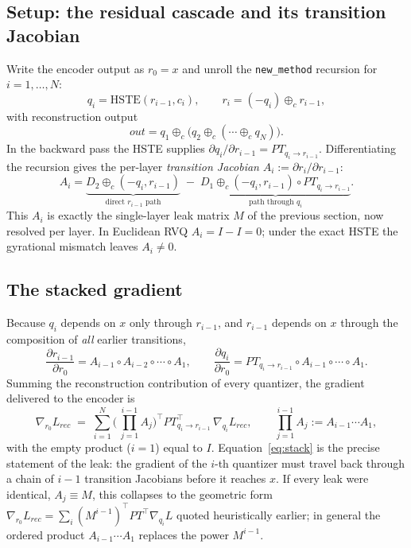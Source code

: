 \documentclass{article}
\begin{document}
\subsection*{Setup: the residual cascade and its transition Jacobian}
Write the encoder output as $r_0 = x$ and unroll the \texttt{new\_method} recursion for $i = 1,\dots,N$:
\begin{equation}
    q_i = \mathrm{HSTE}(r_{i-1}, c_i), \qquad r_i = (-q_i)\oplus_c r_{i-1},
\end{equation}
with reconstruction output
\begin{equation}
    out = q_1 \oplus_c \big(q_2 \oplus_c (\cdots \oplus_c q_N)\big).
\end{equation}
In the backward pass the HSTE supplies $\partial q_i/\partial r_{i-1} = PT_{q_i\to r_{i-1}}$. Differentiating the recursion gives the per-layer \emph{transition Jacobian} $A_i := \partial r_i/\partial r_{i-1}$:
\begin{equation}
    A_i = \underbrace{D_2 \oplus_c(-q_i, r_{i-1})}_{\text{direct } r_{i-1}\text{ path}} \;-\; \underbrace{D_1 \oplus_c(-q_i, r_{i-1}) \circ PT_{q_i\to r_{i-1}}}_{\text{path through } q_i}.
\end{equation}
This $A_i$ is exactly the single-layer leak matrix $M$ of the previous section, now resolved per layer. In Euclidean RVQ $A_i = I - I = 0$; under the exact HSTE the gyrational mismatch leaves $A_i \neq 0$.

\subsection*{The stacked gradient}
Because $q_i$ depends on $x$ only through $r_{i-1}$, and $r_{i-1}$ depends on $x$ through the composition of \emph{all} earlier transitions,
\begin{equation}
    \frac{\partial r_{i-1}}{\partial r_0} = A_{i-1} \circ A_{i-2} \circ \cdots \circ A_1,
    \qquad
    \frac{\partial q_i}{\partial r_0} = PT_{q_i\to r_{i-1}} \circ A_{i-1} \circ \cdots \circ A_1 .
\end{equation}
Summing the reconstruction contribution of every quantizer, the gradient delivered to the encoder is
\begin{equation}\label{eq:stack}
    \nabla_{r_0} L_{rec} \;=\; \sum_{i=1}^{N} \Big(\, \textstyle\prod_{j=1}^{i-1} A_j \Big)^{\!\top} PT_{q_i\to r_{i-1}}^{\top}\, \nabla_{q_i} L_{rec},
    \qquad \textstyle\prod_{j=1}^{i-1} A_j := A_{i-1} \cdots A_1 ,
\end{equation}
with the empty product ($i=1$) equal to $I$. Equation~\eqref{eq:stack} is the precise statement of the leak: the gradient of the $i$-th quantizer must travel back through a chain of $i-1$ transition Jacobians before it reaches $x$. If every leak were identical, $A_j \equiv M$, this collapses to the geometric form $\nabla_{r_0} L_{rec} = \sum_i (M^{i-1})^{\top} PT^{\top} \nabla_{q_i} L$ quoted heuristically earlier; in general the ordered product $A_{i-1}\cdots A_1$ replaces the power $M^{i-1}$.
\end{document}
